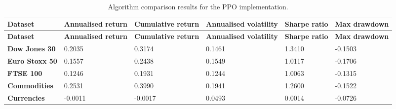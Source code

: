\begin{longtable}{|l|p{2.1cm}|p{2.1cm}|p{2.1cm}|p{1.5cm}|p{2cm}|}
    \caption{Algorithm comparison results for the PPO implementation.}
    \label{tab:experiment_algorithms_ppo}
    \\ 
    \hline
    \textbf{Dataset} & \textbf{Annualised return} & \textbf{Cumulative return} & \textbf{Annualised volatility} & \textbf{Sharpe ratio} & \textbf{Max drawdown}  \\ \midrule
    \endfirsthead

    \hline
    \textbf{Dataset} & \textbf{Annualised return} & \textbf{Cumulative return} & \textbf{Annualised volatility} & \textbf{Sharpe ratio} & \textbf{Max drawdown}  \\ \midrule
    \endhead

    \endfoot
    \hline

    \textbf{Dow Jones 30} & 0.2035 & 0.3174 & 0.1461 & 1.3410 & -0.1503 \\ \hline
    \textbf{Euro Stoxx 50} & 0.1557 & 0.2438 & 0.1549 & 1.0117 & -0.1706 \\ \hline
    \textbf{FTSE 100} & 0.1246 & 0.1931 & 0.1244 & 1.0063 & -0.1315 \\ \hline
    \textbf{Commodities} & 0.2531 & 0.3990 & 0.1941 & 1.2600 & -0.1522 \\ \hline
    \textbf{Currencies} & -0.0011 & -0.0017 & 0.0493 & 0.0014 & -0.0726 \\ \hline
\end{longtable}